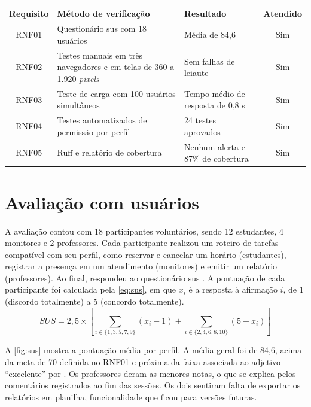 \begin{quadro}[htbp]
  \centering
  \caption{Verificação dos requisitos não funcionais}
  \label{qua:rnf}
  \small
  \begin{tabularx}{\textwidth}{|c|X|X|c|}
    \hline
    \textbf{Requisito} & \textbf{Método de verificação} & \textbf{Resultado} &
      \textbf{Atendido} \\
    \hline
    RNF01 & Questionário \acs{sus} com 18 usuários & Média de 84,6 & Sim \\
    \hline
    RNF02 & Testes manuais em três navegadores e em telas de 360 a 1.920
      \emph{pixels} & Sem falhas de leiaute & Sim \\
    \hline
    RNF03 & Teste de carga com 100 usuários simultâneos & Tempo médio de
      resposta de 0,8 s & Sim \\
    \hline
    RNF04 & Testes automatizados de permissão por perfil & 24 testes
      aprovados & Sim \\
    \hline
    RNF05 & Ruff e relatório de cobertura & Nenhum alerta e 87\% de cobertura
      & Sim \\
    \hline
  \end{tabularx}
  \fonteautor
\end{quadro}

\section{Avaliação com usuários}
\label{sec:testes:usuarios}

A avaliação contou com 18 participantes voluntários, sendo 12 estudantes, 4
monitores e 2 professores. Cada participante realizou um roteiro de tarefas
compatível com seu perfil, como reservar e cancelar um horário (estudantes),
registrar a presença em um atendimento (monitores) e emitir um relatório
(professores). Ao final, respondeu ao questionário \acs{sus}
\cite{brooke1996sus}. A pontuação de cada participante foi calculada pela
\cref{eq:sus}, em que $x_i$ é a resposta à afirmação $i$, de 1 (discordo
totalmente) a 5 (concordo totalmente).
\begin{equation}
  \mathit{SUS} = 2,5 \times \left[ \sum_{i \in \{1, 3, 5, 7, 9\}} (x_i - 1)
    + \sum_{i \in \{2, 4, 6, 8, 10\}} (5 - x_i) \right]
  \label{eq:sus}
\end{equation}

A \cref{fig:sus} mostra a pontuação média por perfil. A média geral foi de
84,6, acima da meta de 70 definida no RNF01 e próxima da faixa associada ao
adjetivo ``excelente'' por \textcite{bangor2009determining}. Os professores
deram as menores notas, o que se explica pelos comentários registrados ao fim
das sessões. Os dois sentiram falta de exportar os relatórios em planilha,
funcionalidade que ficou para versões futuras.

